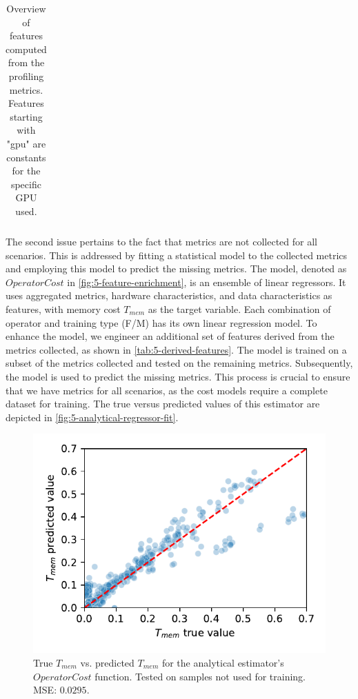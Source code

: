 \begin{table}[ht]
\begin{tabular}{p{0.19\linewidth}p{0.37\linewidth}>{\footnotesize}p{0.35\linewidth}}
        \bottomrule
    \end{tabular}
    \caption[Derived features]{Overview of features computed from the profiling metrics. Features starting with "gpu" are constants for the specific GPU used.}
    \label{tab:5-derived-features}
\end{table}

The second issue pertains to the fact that metrics are not collected for all scenarios. This is addressed by fitting a statistical model to the collected metrics and employing this model to predict the missing metrics. The model, denoted as $OperatorCost$ in \autoref{fig:5-feature-enrichment}, is an ensemble of linear regressors. It uses aggregated metrics, hardware characteristics, and data characteristics as features, with memory cost $T_{mem}$ as the target variable. Each combination of operator and training type (F/M) has its own linear regression model.
To enhance the model, we engineer an additional set of features derived from the metrics collected, as shown in \autoref{tab:5-derived-features}.
The model is trained on a subset of the metrics collected and tested on the remaining metrics. Subsequently, the model is used to predict the missing metrics. This process is crucial to ensure that we have metrics for all scenarios, as the cost models require a complete dataset for training. The true versus predicted values of this estimator are depicted in \autoref{fig:5-analytical-regressor-fit}.

\begin{figure}[ht]
    \centering
    \includegraphics[width=0.5\linewidth]{chapters/05_cost_estimation/figures/analytical-regressor-fit.pdf}
    \caption[Analytical estimator memory cost prediction vs. true values]{True $T_{mem}$ vs. predicted $T_{mem}$ for the analytical estimator's $OperatorCost$ function. Tested on samples not used for training. MSE: $0.0295$.}
    \label{fig:5-analytical-regressor-fit}
\end{figure}

